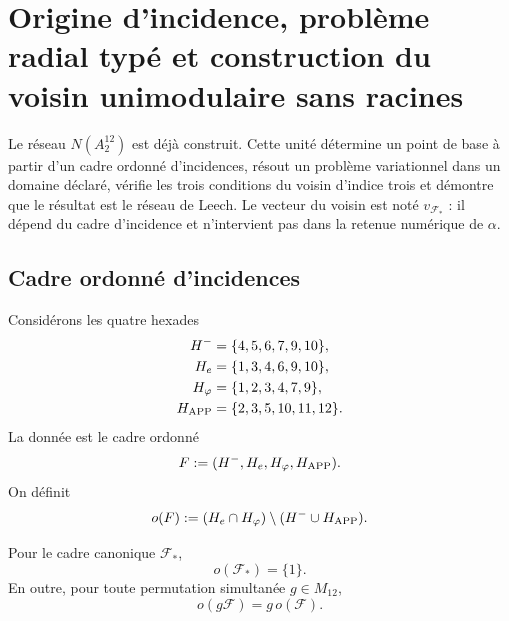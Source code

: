 \section{Origine d'incidence, problème radial typé et construction du voisin unimodulaire sans racines}
\label{p12-83-c20-s5:chap:origen-incidencial-vecino-leech}

Le réseau \(N(A_2^{12})\) est déjà construit. Cette unité détermine un
point de base à partir d'un cadre ordonné d'incidences, résout un
problème variationnel dans un domaine déclaré, vérifie les trois conditions
du voisin d'indice trois et démontre que le résultat est le réseau de
Leech. Le vecteur du voisin est noté \(v_{\mathcal F_*}\) : il dépend du
cadre d'incidence et n'intervient pas dans la retenue numérique de \(\alpha\).

\subsection{Cadre ordonné d'incidences}

Considérons les quatre hexades
\begin{align}
 H^-&=\{4,5,6,7,9,10\},
 \label{p12-83-c20-s5:eq:hexada-marco-negativa}\\
 H_e&=\{1,3,4,6,9,10\},
 \label{p12-83-c20-s5:eq:hexada-marco-e}\\
 H_\varphi&=\{1,2,3,4,7,9\},
 \label{p12-83-c20-s5:eq:hexada-marco-phi}\\
 H_{\rm APP}&=\{2,3,5,10,11,12\}.
 \label{p12-83-c20-s5:eq:hexada-marco-app}
\end{align}
La donnée est le cadre ordonné
\begin{equation}
 \mathcal F:=(H^-,H_e,H_\varphi,H_{\rm APP}).
 \label{p12-83-c20-s5:eq:marco-incidencial-ordenado}
\end{equation}
On définit
\begin{equation}
 o(\mathcal F)
 :=(H_e\cap H_\varphi)\setminus(H^-\cup H_{\rm APP}).
 \label{p12-83-c20-s5:eq:operador-origen-incidencial}
\end{equation}

\begin{theorem}
\label{p12-83-c20-s5:thm:origen-incidencial-equivariante}
Pour le cadre canonique \(\mathcal F_*\),
\begin{equation}
 \boxed{o(\mathcal F_*)=\{1\}.}
 \label{p12-83-c20-s5:eq:origen-incidencial-singleton}
\end{equation}
En outre, pour toute permutation simultanée \(g\in M_{12}\),
\begin{equation}
 o(g\mathcal F)=g\,o(\mathcal F).
 \label{p12-83-c20-s5:eq:equivarianza-origen-incidencial}
\end{equation}
\end{theorem}

